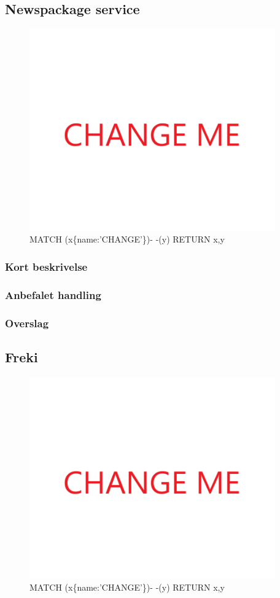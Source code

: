 \documentclass{article}
\begin{document}
\subsection{Newspackage service}
\begin{figure}[h]
\includegraphics[width=300pt]{CHANGE.PNG}
\caption{MATCH (x\{name:'CHANGE'\})- -(y) RETURN x,y}
\end{figure}
\subsubsection{Kort beskrivelse}
\subsubsection{Anbefalet handling}
\subsubsection{Overslag}


\subsection{Freki}
\begin{figure}[h]
\includegraphics[width=300pt]{CHANGE.PNG}
\caption{MATCH (x\{name:'CHANGE'\})- -(y) RETURN x,y}
\end{figure}
\end{document}
